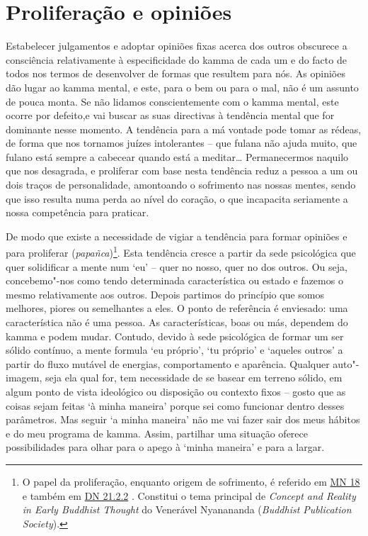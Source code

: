 \section{Proliferação e opiniões}

Estabelecer julgamentos e adoptar opiniões fixas acerca dos outros obscurece a consciência relativamente à especificidade do kamma de cada um e do facto de todos nos termos de desenvolver de formas que resultem para nós. As opiniões dão lugar ao kamma mental, e este, para o bem ou para o mal, não é um assunto de pouca monta. Se não lidamos conscientemente com o kamma mental, este ocorre por defeito,e vai buscar as suas directivas à tendência mental que for dominante nesse momento. A tendência para a má vontade pode tomar as rédeas, de forma que nos tornamos juízes intolerantes -- que fulana não ajuda muito, que fulano está sempre a cabecear quando está a meditar\ldots{} Permanecermos naquilo que nos desagrada, e proliferar com base nesta tendência reduz a pessoa a um ou dois traços de personalidade, amontoando o sofrimento nas nossas mentes, sendo que isso resulta numa perda ao nível do coração, o que incapacita seriamente a nossa competência para praticar.

De modo que existe a necessidade de vigiar a tendência para formar opiniões e para proliferar (\emph{papañca})\footnote{O papel da proliferação, enquanto origem de sofrimento, é referido em \href{https://suttacentral.net/mn18/en/sujato}{MN 18} e também em \href{https://suttacentral.net/dn21/en/sujato}{DN 21.2.2} . Constitui o tema principal de \emph{Concept and Reality in Early Buddhist Thought} do Venerável Nyanananda (\emph{Buddhist Publication Society}).}. Esta tendência cresce a partir da sede psicológica que quer solidificar a mente num `eu' -- quer no nosso, quer no dos outros. Ou seja, concebemo"-nos como tendo determinada característica ou estado e fazemos o mesmo relativamente aos outros. Depois partimos do princípio que somos melhores, piores ou semelhantes a eles. O ponto de referência é enviesado: uma característica não é uma pessoa. As características, boas ou más, dependem do kamma e podem mudar. Contudo, devido à sede psicológica de formar um ser sólido contínuo, a mente formula `eu próprio', `tu próprio' e `aqueles outros' a partir do fluxo mutável de energias, comportamento e aparência. Qualquer auto"-imagem, seja ela qual for, tem necessidade de se basear em terreno sólido, em algum ponto de vista ideológico ou disposição ou contexto fixos -- gosto que as coisas sejam feitas `à minha maneira' porque sei como funcionar dentro desses parâmetros. Mas seguir `a minha maneira' não me vai fazer sair dos meus hábitos e do meu programa de kamma. Assim, partilhar uma situação oferece possibilidades para olhar para o apego à `minha maneira' e para a largar.


